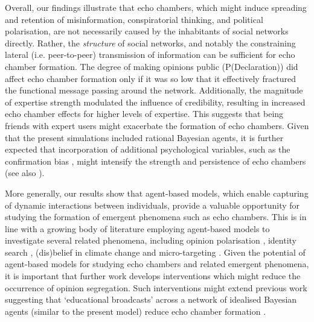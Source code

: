 \documentclass[fleqn,10pt]{wlscirep}
\begin{document}
Overall, our findings illustrate that echo chambers, which might induce spreading and retention of misinformation\cite{vosoughi2018spread}, conspiratorial thinking\cite{del2016spreading}, and political polarisation\cite{bessi2016users, del2016echo}, are not necessarily caused by the inhabitants of social networks directly. Rather, the \textit{structure} of social networks, and notably the constraining lateral (i.e. peer-to-peer) transmission of information can be sufficient for echo chamber formation. The degree of making opinions public (P(Declaration)) did affect echo chamber formation only if it was so low that it effectively fractured the functional message passing around the network. Additionally, the magnitude of expertise strength modulated the influence of credibility, resulting in increased echo chamber effects for higher levels of expertise. This suggests that being friends with expert users might exacerbate the formation of echo chambers. Given that the present simulations included rational Bayesian agents, it is further expected that incorporation of additional psychological variables, such as the confirmation bias \cite{del2016spreading, ngampruetikorn2016bias, starnini2016emergence}, might intensify the strength and persistence of echo chambers (see also \cite{pilditch2017opinion}).

More generally, our results show that agent-based models, which enable capturing of dynamic interactions between individuals, provide a valuable opportunity for studying the formation of emergent phenomena such as echo chambers. This is in line with a growing body of literature employing agent-based models to investigate several related phenomena, including opinion polarisation \cite{duggins2017}, identity search \cite{watts2002identity}, (dis)belief in climate change \cite{williams2015network, lewandowsky2019influence} and micro-targeting \cite{madsen2018method}. Given the potential of agent-based models for studying echo chambers and related emergent phenomena, it is important that further work develops interventions which might reduce the occurrence of opinion segregation. Such interventions might extend previous work suggesting that `educational broadcasts' across a network of idealised Bayesian agents (similar to the present model) reduce echo chamber formation \cite{madsen2018large}.
\end{document}
